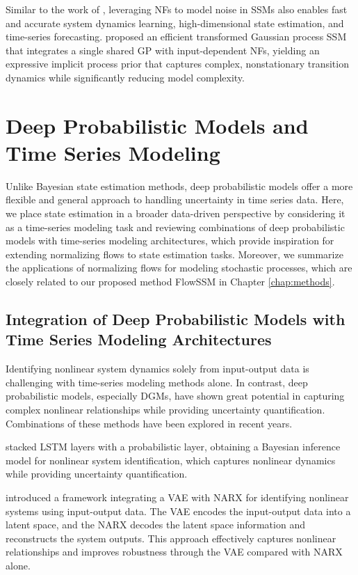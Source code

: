 Similar to the work of \citeauthor{wang2025flow} \citeyearpar{wang2025flow}, leveraging \acp{NF} to model noise in \acp{SSM} also enables fast and accurate system dynamics learning, high-dimensional state estimation, and time-series forecasting. \citeauthor{lin2025} \citeyearpar{lin2025} proposed an efficient transformed Gaussian process \ac{SSM} that integrates a single shared \ac{GP} with input-dependent \acp{NF}, yielding an expressive implicit process prior that captures complex, nonstationary transition dynamics while significantly reducing model complexity.

\section{Deep Probabilistic Models and Time Series Modeling}
Unlike Bayesian state estimation methods, deep probabilistic models offer a more flexible and general approach to handling uncertainty in time series data. Here, we place state estimation in a broader data-driven perspective by considering it as a time-series modeling task and reviewing combinations of deep probabilistic models with time-series modeling architectures, which provide inspiration for extending normalizing flows to state estimation tasks. Moreover, we summarize the applications of normalizing flows for modeling stochastic processes, which are closely related to our proposed method FlowSSM in Chapter \ref{chap:methods}.

\subsection{Integration of Deep Probabilistic Models with Time Series Modeling Architectures}
Identifying nonlinear system dynamics solely from input-output data is challenging with time-series modeling methods alone. In contrast, deep probabilistic models, especially \acp{DGM}, have shown great potential in capturing complex nonlinear relationships while providing uncertainty quantification. Combinations of these methods have been explored in recent years.

\citeauthor{8972113} \citeyearpar{8972113} stacked \ac{LSTM} layers with a probabilistic layer, obtaining a Bayesian inference model for nonlinear system identification, which captures nonlinear dynamics while providing uncertainty quantification. 

\citeauthor{PANIAGUA2024200344} \citeyearpar{PANIAGUA2024200344} introduced a framework integrating a \ac{VAE} with \ac{NARX} for identifying nonlinear systems using input-output data. The \ac{VAE} encodes the input-output data into a latent space, and the \ac{NARX} decodes the latent space information and reconstructs the system outputs. This approach effectively captures nonlinear relationships and improves robustness through the \ac{VAE} compared with \ac{NARX} alone. 

